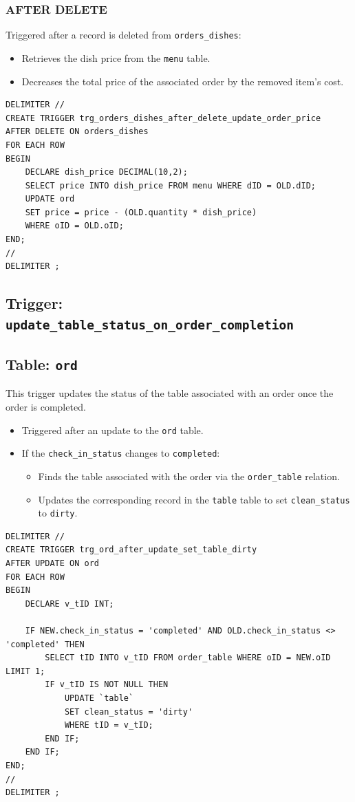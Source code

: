 \documentclass[12pt]{article}
\begin{document}
\subsubsection*{AFTER DELETE}
Triggered after a record is deleted from \texttt{orders\_dishes}:
\begin{itemize}
    \item Retrieves the dish price from the \texttt{menu} table.
    \item Decreases the total price of the associated order by the removed item's cost.
\end{itemize}

\begin{lstlisting}
DELIMITER //
CREATE TRIGGER trg_orders_dishes_after_delete_update_order_price
AFTER DELETE ON orders_dishes
FOR EACH ROW
BEGIN
    DECLARE dish_price DECIMAL(10,2);
    SELECT price INTO dish_price FROM menu WHERE dID = OLD.dID;
    UPDATE ord
    SET price = price - (OLD.quantity * dish_price)
    WHERE oID = OLD.oID;
END;
//
DELIMITER ;
\end{lstlisting}

\subsection{Trigger: \texttt{update\_table\_status\_on\_order\_completion}}

\subsection*{Table: \texttt{ord}}
This trigger updates the status of the table associated with an order once the order is completed.

\begin{itemize}
    \item Triggered after an update to the \texttt{ord} table.
    \item If the \texttt{check\_in\_status} changes to \texttt{completed}:
    \begin{itemize}
        \item Finds the table associated with the order via the \texttt{order\_table} relation.
        \item Updates the corresponding record in the \texttt{table} table to set \texttt{clean\_status} to \texttt{dirty}.
    \end{itemize}
\end{itemize} 

\begin{lstlisting}
DELIMITER //
CREATE TRIGGER trg_ord_after_update_set_table_dirty
AFTER UPDATE ON ord
FOR EACH ROW
BEGIN
    DECLARE v_tID INT;

    IF NEW.check_in_status = 'completed' AND OLD.check_in_status <> 'completed' THEN
        SELECT tID INTO v_tID FROM order_table WHERE oID = NEW.oID LIMIT 1;
        IF v_tID IS NOT NULL THEN
            UPDATE `table`
            SET clean_status = 'dirty'
            WHERE tID = v_tID;
        END IF;
    END IF;
END;
//
DELIMITER ;
\end{lstlisting}
\end{document}
